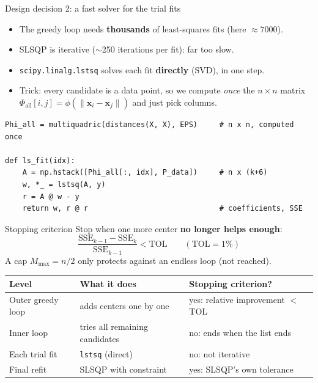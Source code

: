 \documentclass[10pt,aspectratio=169]{beamer}
\newcommand{\hl}[1]{\textcolor{accent}{\textbf{#1}}}
\newcommand{\x}{\bm{x}}
\begin{document}
\begin{frame}[fragile]{Design decision 2: a fast solver for the trial fits}
  \begin{itemize}
    \item The greedy loop needs \hl{thousands} of least-squares fits
          (here $\approx 7000$).
    \item SLSQP is iterative ($\sim$250 iterations per fit): far too slow.
    \item \texttt{scipy.linalg.lstsq} solves each fit \hl{directly}
          (SVD), in one step.
    \item Trick: every candidate is a data point, so we compute
          \emph{once} the $n\times n$ matrix
          $\Phi_{\text{all}}[i,j] = \phi(\lVert \x_i - \x_j\rVert)$ and just
          pick columns.
  \end{itemize}
\begin{lstlisting}
Phi_all = multiquadric(distances(X, X), EPS)     # n x n, computed once

def ls_fit(idx):
    A = np.hstack([Phi_all[:, idx], P_data])     # n x (k+6)
    w, *_ = lstsq(A, y)
    r = A @ w - y
    return w, r @ r                              # coefficients, SSE
\end{lstlisting}
\end{frame}

\begin{frame}{Stopping criterion}
  Stop when one more center \hl{no longer helps enough}:
  \[
    \frac{\text{SSE}_{k-1} - \text{SSE}_k}{\text{SSE}_{k-1}} < \text{TOL}
    \qquad (\text{TOL} = 1\%)
  \]
  A cap $M_{\max} = n/2$ only protects against an endless loop (not reached).
  \vspace{0.5em}

  \centering\small
  \begin{tabular}{lll}
    \toprule
    Level & What it does & Stopping criterion? \\
    \midrule
    Outer greedy loop & adds centers one by one & yes: relative improvement $<$ TOL \\
    Inner loop & tries all remaining candidates & no: ends when the list ends \\
    Each trial fit & \texttt{lstsq} (direct) & no: not iterative \\
    Final refit & SLSQP with constraint & yes: SLSQP's own tolerance \\
    \bottomrule
  \end{tabular}
\end{frame}
\end{document}
